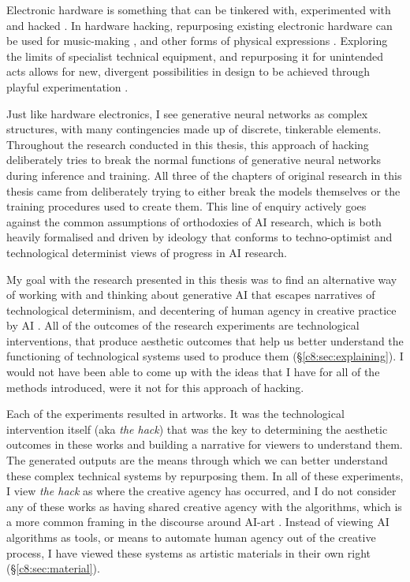Electronic hardware is something that can be tinkered with, experimented with and hacked \citep{collins2004hardware, grand2004hardware}. 
In hardware hacking, repurposing existing electronic hardware can be used for music-making \citep{collins2009handmade}, and other forms of physical expressions \citep{hartmann2008hacking}.
Exploring the limits of specialist technical equipment, and repurposing it for unintended acts allows for new, divergent possibilities in design to be achieved through playful experimentation \citep{goddard2015playful}.

Just like hardware electronics, I see generative neural networks as complex structures, with many contingencies made up of discrete, tinkerable elements.
Throughout the research conducted in this thesis, this approach of hacking deliberately tries to break the normal functions of generative neural networks during inference and training. 
All three of the chapters of original research in this thesis came from deliberately trying to either break the models themselves or the training procedures used to create them.
This line of enquiry actively goes against the common assumptions of orthodoxies of AI research, which is both heavily formalised and driven by ideology \citep{sias2021ideology} that conforms to techno-optimist \citep{andreesen2023techno} and technological determinist \citep{drew2016technological} views of progress in AI research. 

My goal with the research presented in this thesis was to find an alternative way of working with and thinking about generative AI that escapes narratives of technological determinism, and decentering of human agency in creative practice by AI \citep{zeilinger2021tactical}.
All of the outcomes of the research experiments are technological interventions, that produce aesthetic outcomes that help us better understand the functioning of technological systems used to produce them (\S \ref{c8:sec:explaining}). 
I would not have been able to come up with the ideas that I have for all of the methods introduced, were it not for this approach of hacking.

Each of the experiments resulted in artworks.
It was the technological intervention itself (aka \textit{the hack}) that was the key to determining the aesthetic outcomes in these works and building a narrative for viewers to understand them.
The generated outputs are the means through which we can better understand these complex technical systems by repurposing them.
In all of these experiments, I view \textit{the hack} as where the creative agency has occurred, and I do not consider any of these works as having shared creative agency with the algorithms, which is a more common framing in the discourse around AI-art \citep{moruzzi2022creative}.
Instead of viewing AI algorithms as tools, or means to automate human agency out of the creative process, I have viewed these systems as artistic materials in their own right (\S \ref{c8:sec:material}).

